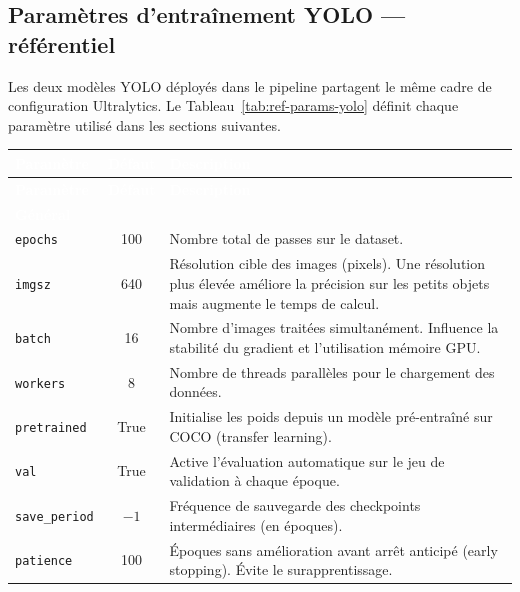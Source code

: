 \subsection{Paramètres d'entraînement YOLO — référentiel}
\label{subsec:yolo-params-ref}

Les deux modèles YOLO déployés dans le pipeline partagent le même cadre de configuration Ultralytics. Le Tableau~\ref{tab:ref-params-yolo} définit chaque paramètre utilisé dans les sections suivantes.

\renewcommand{\arraystretch}{1.3}
\begin{longtable}{|l|c|p{8.5cm}|}
  \rowcolor{bleu_principal}
  \textcolor{white}{\textbf{Paramètre}} & \textcolor{white}{\textbf{Défaut}} & \textcolor{white}{\textbf{Description}} \\
  \hline
  \endfirsthead
  \rowcolor{bleu_principal}
  \textcolor{white}{\textbf{Paramètre}} & \textcolor{white}{\textbf{Défaut}} & \textcolor{white}{\textbf{Description}} \\
  \hline
  \endhead
  \multicolumn{3}{|l|}{\cellcolor{gris_fonce}\textcolor{white}{\textbf{Général}}} \\
  \hline
  \texttt{epochs} & 100 & Nombre total de passes sur le dataset. \\
  \hline
  \texttt{imgsz} & 640 & Résolution cible des images (pixels). Une résolution plus élevée améliore la précision sur les petits objets mais augmente le temps de calcul. \\
  \hline
  \texttt{batch} & 16 & Nombre d'images traitées simultanément. Influence la stabilité du gradient et l'utilisation mémoire GPU. \\
  \hline
  \texttt{workers} & 8 & Nombre de threads parallèles pour le chargement des données. \\
  \hline
  \texttt{pretrained} & True & Initialise les poids depuis un modèle pré-entraîné sur COCO (transfer learning). \\
  \hline
  \texttt{val} & True & Active l'évaluation automatique sur le jeu de validation à chaque époque. \\
  \hline
  \texttt{save\_period} & $-1$ & Fréquence de sauvegarde des checkpoints intermédiaires (en époques). \\
  \hline
  \texttt{patience} & 100 & Époques sans amélioration avant arrêt anticipé (early stopping). Évite le surapprentissage. \\

\end{longtable}

